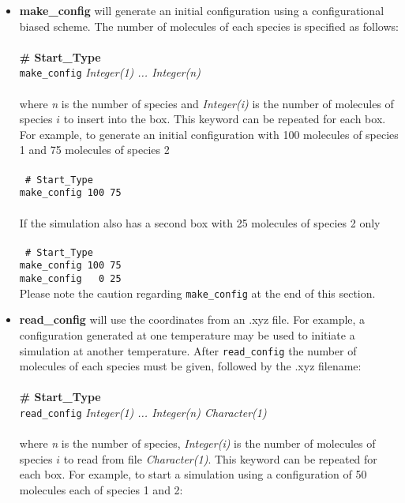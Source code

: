\begin{itemize}
\item \textbf{make\_config} will generate an initial configuration using a configurational biased scheme.
The number of molecules of each species is specified as follows: \\ \\
%
{\bf \# Start\_Type} \\
{\tt make\_config} {\it Integer(1) ... Integer(n)} \\ \\
%
where {\it n} is the number of species and {\it Integer(i)} is the number of molecules of species $i$ to insert into the box.
This keyword can be repeated for each box.
For example, to generate an initial configuration with 100 molecules of species 1 and 75 molecules of species 2 \\ \\
%
 \texttt{
 \# Start\_Type \\
 make\_config 100 75 \\} \\
%
If the simulation also has a second box with 25 molecules of species 2 only \\ \\
%
 \texttt{
 \# Start\_Type \\
 make\_config 100 75\\
 make\_config \ \ 0 25\\}
%
Please note the caution regarding {\tt make\_config} at the end of this section. \\
%
\item {\textbf{read\_config}} will use the coordinates from an .xyz file.
For example, a configuration generated at one temperature may be used to initiate a simulation at another temperature.
After {\tt read\_config} the number of molecules of each species must be given, followed by the .xyz filename: \\ \\
%
{\bf \# Start\_Type} \\
{\tt read\_config} {\it Integer(1) ... Integer(n) Character(1)}\\ \\
%
where {\it n} is the number of species, {\it Integer(i)} is the number of molecules
of species $i$ to read from file {\it Character(1)}.
This keyword can be repeated for each box.
For example, to start a simulation using a configuration of 50 molecules each of species 1 and 2: \\ \\

\end{itemize}
